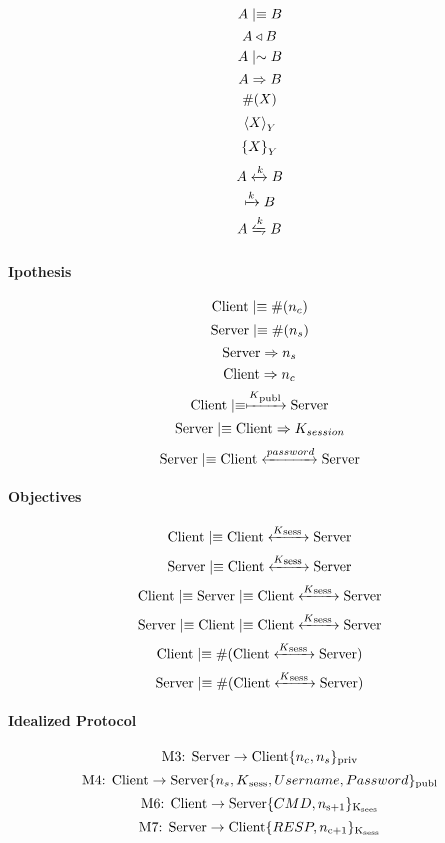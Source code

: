 \[A \mid\equiv B \]
\[A \triangleleft B \]
\[A \mid\sim B \]
\[A \Rightarrow B \]
\[\#(X)\]
\[{\langle X \rangle}_{Y}\]
\[{ \{ X \} }_{Y}\]
\[A \xleftrightarrow{k} B \]
\[\xmapsto{k} B\]
\[A \secret{k} B\]

\paragraph{Ipothesis}
\[\textnormal{Client} \mid\equiv \#(n_c)\]
\[\textnormal{Server} \mid\equiv \#(n_s)\]
\[\textnormal{Server} \Rightarrow n_s\]
\[\textnormal{Client} \Rightarrow n_c\]
\[\textnormal{Client} \mid\equiv \xmapsto{K\textsubscript{publ}} \textnormal{Server}\]
\[\textnormal{Server} \mid\equiv \textnormal{Client} \Rightarrow K_{session}\]
\[\textnormal{Server} \mid\equiv \textnormal{Client} \xleftrightarrow{password} \textnormal{Server}\]

\paragraph{Objectives}
\[\textnormal{Client} \mid\equiv \textnormal{Client} \xleftrightarrow{K\textsubscript{sess }} \textnormal{Server}\]
\[\textnormal{Server} \mid\equiv \textnormal{Client} \xleftrightarrow{K\textsubscript{sess }} \textnormal{Server}\]
\[\textnormal{Client} \mid\equiv \textnormal{Server} \mid\equiv \textnormal{Client} \xleftrightarrow{K\textsubscript{sess }} \textnormal{Server}\]
\[\textnormal{Server} \mid\equiv \textnormal{Client} \mid\equiv \textnormal{Client} \xleftrightarrow{K\textsubscript{sess }} \textnormal{Server}\]
\[\textnormal{Client} \mid\equiv \#(\textnormal{Client} \xleftrightarrow{K\textsubscript{sess }} \textnormal{Server})\]
\[\textnormal{Server} \mid\equiv \#(\textnormal{Client} \xleftrightarrow{K\textsubscript{sess }} \textnormal{Server})\]

\paragraph{Idealized Protocol}
\[\textnormal{M3: Server} \rightarrow \textnormal{Client} \lbrace n_c,n_s \rbrace \textsubscript{priv} \]
\[\textnormal{M4: Client} \rightarrow \textnormal{Server} \lbrace n_s,K\textsubscript{sess},Username,Password \rbrace \textsubscript{publ}\]
\[\textnormal{M6: Client} \rightarrow \textnormal{Server} \lbrace CMD,n\textsubscript{s+1} \rbrace \textsubscript{K\textsubscript{sees}}\]
\[\textnormal{M7: Server} \rightarrow \textnormal{Client} \lbrace RESP,n\textsubscript{c+1} \rbrace \textsubscript{K\textsubscript{sess}}\]
